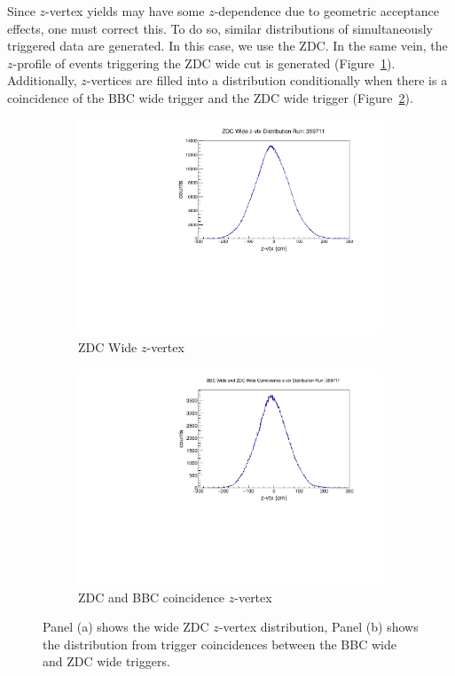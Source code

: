Since $z$-vertex yields may have some $z$-dependence due to geometric acceptance
effects, one must correct this. To do so, similar distributions of
simultaneously triggered data are generated. In this case, we use the ZDC. In
the same vein, the $z$-profile of events triggering the ZDC wide cut is
generated (Figure~\ref{fig:zdc_novtxcut}). Additionally, $z$-vertices are filled
into a distribution conditionally when there is a coincidence of the BBC wide
trigger and the ZDC wide trigger (Figure~\ref{fig:zdc_and_bbc}).

\begin{figure}[hb]
  \centering
  \begin{subfigure}[b]{0.7\linewidth}
    \includegraphics[width=\textwidth]{./figures/zdc_wide_z_359711.pdf}
    \caption{ZDC Wide $z$-vertex}
    \label{fig:zdc_novtxcut}
  \end{subfigure}
  \begin{subfigure}[b]{0.7\linewidth}
    \includegraphics[width=\textwidth]{./figures/zdc_coincidence.pdf}
    \caption{ZDC and BBC coincidence $z$-vertex}
    \label{fig:zdc_and_bbc}
  \end{subfigure}
  \caption{
    Panel (a) shows the wide ZDC $z$-vertex distribution, Panel (b) shows the
    distribution from trigger coincidences between the BBC wide and ZDC wide
    triggers.
  }
  \label{fig:z_dep_generators}
\end{figure}

